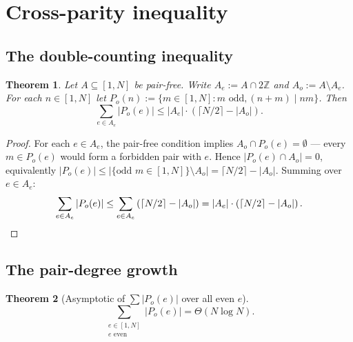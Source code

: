 \documentclass[11pt]{amsart}
\theoremstyle{plain}
\newtheorem{theorem}{Theorem}[section]
\theoremstyle{definition}
\newcommand{\Z}{\mathbb{Z}}
\begin{document}
\section{Cross-parity inequality}\label{sec:structure}

\subsection{The double-counting inequality}

\begin{theorem}\label{thm:double-counting}
Let $A \subseteq [1, N]$ be pair-free. Write $A_e := A \cap 2\Z$ and $A_o := A \setminus A_e$. For each $n \in [1, N]$ let $P_o(n) := \{m \in [1, N] : m \text{ odd}, (n + m) \mid nm\}$. Then
\[
  \sum_{e \in A_e} |P_o(e)| \leq |A_e| \cdot \left(\lceil N/2 \rceil - |A_o|\right).
\]
\end{theorem}

\begin{proof}
For each $e \in A_e$, the pair-free condition implies $A_o \cap P_o(e) = \emptyset$ --- every $m \in P_o(e)$ would form a forbidden pair with $e$. Hence $|P_o(e) \cap A_o| = 0$, equivalently $|P_o(e)| \leq |\{\text{odd } m \in [1, N]\} \setminus A_o| = \lceil N/2 \rceil - |A_o|$. Summing over $e \in A_e$:
\[
  \sum_{e \in A_e} |P_o(e)| \leq \sum_{e \in A_e} \left(\lceil N/2 \rceil - |A_o|\right) = |A_e| \cdot \left(\lceil N/2 \rceil - |A_o|\right). \qedhere
\]
\end{proof}

\subsection{The pair-degree growth}

\begin{theorem}[Asymptotic of $\sum |P_o(e)|$ over all even $e$]\label{thm:Po-sum}
\[
  \sum_{\substack{e \in [1, N] \\ e \text{ even}}} |P_o(e)| = \Theta(N \log N).
\]
\end{theorem}
\end{document}
